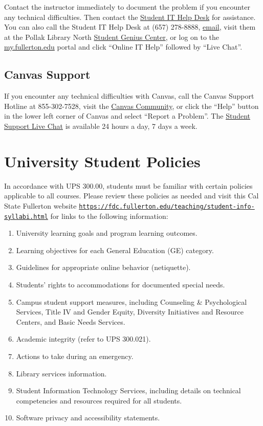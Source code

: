 \documentclass[11pt, letterpaper]{article}
\begin{document}
Contact the instructor immediately to document the problem if you encounter any technical difficulties. Then contact the \href{http://www.fullerton.edu/it/students/helpdesk/index.php}{Student IT Help Desk} for assistance. You can also call the Student IT Help Desk at (657) 278-8888, \href{mailto:StudentITHelpDesk@fullerton.edu}{email}, visit them at the Pollak Library North \href{http://www.fullerton.edu/it/students/sgc/index.php}{Student Genius Center}, or log on to the \href{http://my.fullerton.edu/}{my.fullerton.edu} portal and click ``Online IT Help'' followed by ``Live Chat''.

\subsection*{Canvas Support}

If you encounter any technical difficulties with Canvas, call the Canvas Support Hotline at 855-302-7528, visit the \href{https://community.canvaslms.com/docs/DOC-10720-67952720329}{Canvas Community}, or click the ``Help'' button in the lower left corner of Canvas and select ``Report a Problem''. The \href{https://cases.canvaslms.com/liveagentchat?chattype=student&sfid=001A000000YzcwQIAR}{Student Support Live Chat} is available 24 hours a day, 7 days a week.


\section{University Student Policies}

In accordance with UPS 300.00, students must be familiar with certain policies applicable to all courses. Please review these policies as needed and visit this Cal State Fullerton website \texttt{\href{https://fdc.fullerton.edu/teaching/student-info-syllabi.html}{https://fdc.fullerton.edu/teaching/student-info-syllabi.html}} for links to the following information:

\begin{enumerate}
    \item   University learning goals and program learning outcomes.
    \item	Learning objectives for each General Education (GE) category.
    \item	Guidelines for appropriate online behavior (netiquette).
    \item	Students’ rights to accommodations for documented special needs.
    \item   Campus student support measures, including Counseling \& Psychological Services, Title IV and Gender Equity, Diversity Initiatives and Resource Centers, and Basic Needs Services.
    \item	Academic integrity (refer to UPS 300.021).
    \item	Actions to take during an emergency.
    \item	Library services information.
    \item	Student Information Technology Services, including details on technical competencies and resources required for all students.
    \item	Software privacy and accessibility statements.
\end{enumerate}
\end{document}
